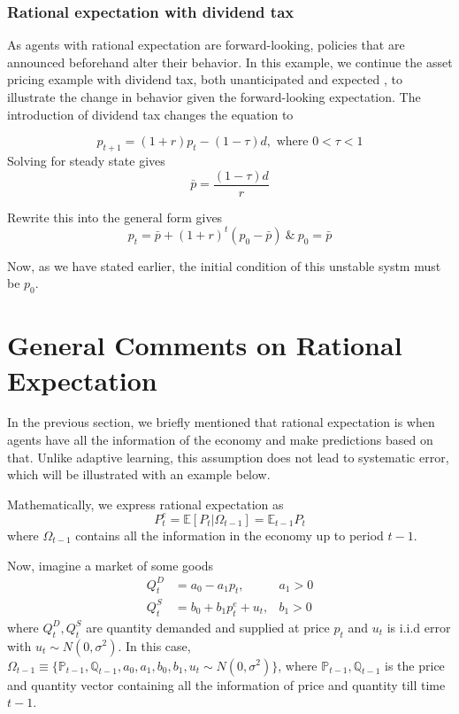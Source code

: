 \documentclass[twocolumn, fleqn]{article}
\begin{document}
			\subsubsection{Rational expectation with dividend tax}
				As agents with rational expectation are forward-looking, policies that are announced beforehand alter their behavior.
				In this example, we continue the asset pricing example with dividend tax, both unanticipated and expected
				,
				to illustrate the change in behavior given the forward-looking expectation.
				The introduction of dividend tax changes the equation to

				\begin{equation*}
						p_{t+1} = (1+r)p_t - (1-\tau)d, \text{ where } 0<\tau<1
				\end{equation*}
				Solving for steady state gives
				\begin{equation*}
						\bar{p} = \frac{(1-\tau)d}{r}
				\end{equation*}

				Rewrite this into the general form gives
				\begin{equation*}
						p_t = \bar{p} + (1+r)^t(p_0-\bar{p}) \ \& \ p_0 = \bar{p}
				\end{equation*}

				Now, as we have stated earlier, the initial condition of this unstable systm must be $p_0$.


	\section{General Comments on Rational Expectation}
		In the previous section, we briefly mentioned that rational expectation is when agents have all the
		information of the economy and make predictions based on that.
		Unlike adaptive learning, this assumption does not lead to systematic error, which will be illustrated with
		an example below.

		Mathematically, we express rational expectation as
		\begin{equation}
			P_{t}^e = \mathbb{E}[P_t|\Omega_{t-1}] = \mathbb{E}_{t-1}P_t
		\end{equation}
		where $\Omega_{t-1}$ contains all the information in the economy up to period $t-1$.

		Now, imagine a market of some goods
		\begin{align*}
			Q_t^D &= a_0 -a_1 p_t, &a_1>0\\
			Q_t^S &= b_0 + b_1 p_t^e +u_t, &b_1>0
		\end{align*}
		where $Q_t^D, Q_t^S$ are quantity demanded and supplied at price $p_t$ and $u_t$ is i.i.d error with
		$u_t \sim N(0,\sigma^2)$.
		In this case, $\Omega_{t-1} \equiv \{\mathbb{P}_{t-1}, \mathbb{Q}_{t-1}, a_0, a_1, b_0, b_1, u_t \sim N(0,\sigma^2)\}$, where $\mathbb{P}_{t-1}, \mathbb{Q}_{t-1}$ is the price and quantity vector containing all the information of price and quantity till time $t-1$.
\end{document}
